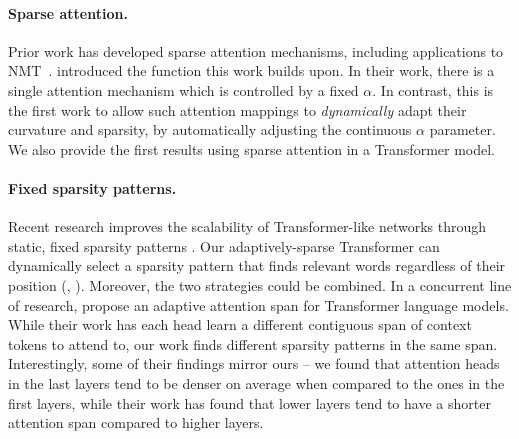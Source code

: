 \paragraph*{Sparse attention.}
Prior work has developed sparse attention mechanisms, including
applications to NMT~\citep{sparsemax, malaviya2018sparse, fusedmax,
    shao2019ssn, maruf2019selective}. \citet{entmax} introduced the
\entmaxtext function this work builds upon. In their work, there is a
single attention mechanism which is controlled by a fixed $\alpha$.
In contrast, this is the first work to allow such attention mappings
to \emph{dynamically} adapt their curvature and sparsity, by
automatically adjusting the continuous $\alpha$ parameter. We also
provide the first results using sparse attention in a Transformer
model.

\paragraph*{Fixed sparsity patterns.}
Recent research improves the scalability of Transformer-like networks
through static, fixed sparsity patterns
\citep{openai_sparse_transf,dynamic_conv}. Our adaptively-sparse
Transformer can dynamically select a sparsity pattern that finds
relevant words regardless of their position (\eg,
). Moreover, the two strategies could be
combined. In a concurrent line of research, \citet{Sukhbaatar2019}
propose an adaptive attention span for Transformer language models.
While their work has each head learn a different contiguous span of
context tokens to attend to, our work finds different sparsity
patterns in the same span. Interestingly, some of their findings
mirror ours -- we found that attention heads in the last layers tend
to be denser on average when compared to the ones in the first
layers, while their work has found that lower layers tend to have a
shorter attention span compared to higher layers.

